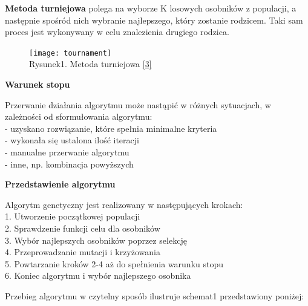 \documentclass[a4paper, twoside, 12pt, justified]{article}
\begin{document}
	\textbf{Metoda turniejowa} polega na wyborze K losowych osobników z populacji, a następnie spośród nich wybranie najlepszego, który zostanie rodzicem. Taki sam proces jest wykonywany w celu znalezienia drugiego rodzica.\\
	
	
	\begin{figure}[h]
		\texttt{[image: tournament]}
		\centering
		\\
		{Rysunek1. Metoda turniejowa \hyperlink{selection}{[3]} } 
	\end{figure}
	
	
	\begin{center}
		\textbf{Warunek stopu}
	\end{center} 	

	Przerwanie działania algorytmu może nastąpić w różnych sytuacjach, w zależności od sformułowania algorytmu:\\
	- uzyskano rozwiązanie, które spełnia minimalne kryteria\\
	- wykonała się ustalona ilość iteracji\\
	- manualne przerwanie algorytmu\\
	- inne, np. kombinacja powyższych\\

 	\begin{large}
 		\begin{center}
 			\textbf{Przedstawienie algorytmu}
 		\end{center}
 	\end{large}
 
	
	Algorytm genetyczny jest realizowany w następujących krokach:\\
	1. Utworzenie początkowej populacji\\
	2. Sprawdzenie funkcji celu dla osobników\\
	3. Wybór najlepszych osobników poprzez selekcję\\
	4. Przeprowadzanie mutacji i krzyżowania\\
	5. Powtarzanie kroków 2-4 aż do spełnienia warunku stopu\\
	6. Koniec algorytmu i wybór najlepszego osobnika
	
	\newpage
	
	Przebieg algorytmu w czytelny sposób ilustruje schemat1 przedstawiony poniżej:\\
	
\end{document}
